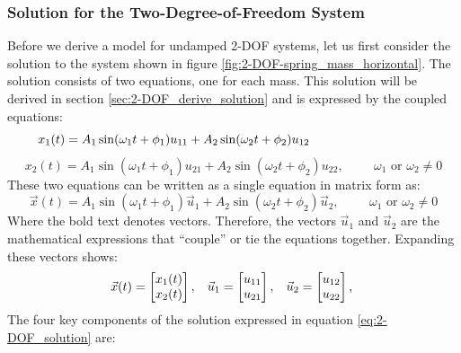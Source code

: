 \documentclass[12pt,letter]{article}
\begin{document}
	\subsubsection{Solution for the Two-Degree-of-Freedom System}
	Before we derive a model for undamped 2-DOF systems, let us first consider the solution to the system shown in figure \ref{fig:2-DOF-spring_mass_horizontal}. The solution consists of two equations, one for each mass. This solution will be derived in section \ref{sec:2-DOF_derive_solution} and is expressed by the coupled equations:
	\begin{equation}
		x_1(t) = A_1 \sin (\omega_1 t + \phi_1 )u_{11}+ A_2 \sin (\omega_2 t + \phi_2 )u_{12} \hspace{3.35cm} 
	\end{equation}
	\begin{equation}
		x_2(t) = A_1 \sin (\omega_1 t + \phi_1 )u_{21}+ A_2 \sin (\omega_2 t + \phi_2 )u_{22} , \hspace{1cm} \omega_1 \text{ or } \omega_2 \neq 0 \nonumber
	\end{equation}
	These two equations can be written as a single equation in matrix form as:
	\begin{equation}
		\vec{x}(t) = A_1 \sin (\omega_1 t + \phi_1 )\vec{u}_1 + A_2 \sin (\omega_2 t + \phi_2 )\vec{u}_2 , \hspace{1cm} \omega_1 \text{ or } \omega_2 \neq 0
		\label{eq:2-DOF_solution}
	\end{equation}
	Where the bold text denotes vectors. Therefore, the vectors $\vec{u}_1$ and $\vec{u}_2$ are the mathematical expressions that ``couple'' or tie the equations together. Expanding these vectors shows: 
	\begin{eqnarray}
	 \vec{x}(t)=  \begin{bmatrix} x_1(t) \\  x_2(t) \end{bmatrix}, \hspace{2ex} \vec{u}_1=  \begin{bmatrix} u_{11} \\  u_{21} \end{bmatrix}, \hspace{2ex} \vec{u}_2=  \begin{bmatrix} u_{12} \\  u_{22} \end{bmatrix}\text{, }
	\end{eqnarray}
	The four key components of the solution expressed in equation \ref{eq:2-DOF_solution} are:
\end{document}

